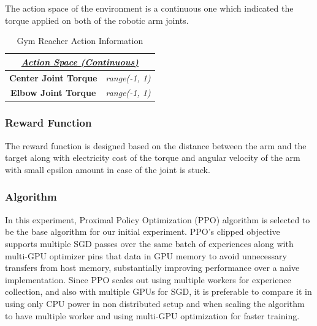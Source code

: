 The action space of the environment is a continuous one which indicated the torque applied on both of the robotic arm joints.


\begin{table}[!htb]
		\centering
		\begin{tabular}{|c|c|}
				\hline
				\multicolumn{2}{|c|}{{\ul \textit{\textbf{Action Space (Continuous)}}}}                             \\ \hline
				\multirow{2}{*}{\textbf{Center Joint Torque}} & \multirow{2}{*}{\textit{range(-1, 1)}} \\
																												&                                        \\ \hline
				\multirow{2}{*}{\textbf{Elbow Joint Torque}}  & \multirow{2}{*}{\textit{range(-1, 1)}} \\
																												&                                        \\ \hline
		\end{tabular}
				\caption{Gym Reacher Action Information}
				\label{tab:gym_reacher_actions}
\end{table}

\subsubsection{Reward Function}

The reward function is designed based on the distance between the arm and the target along with electricity cost of the torque and angular velocity of the arm with small epsilon amount in case of the joint is stuck. 

\subsubsection{Algorithm}

In this experiment, Proximal Policy Optimization (PPO) algorithm is selected to be the base algorithm for our initial experiment. PPO’s clipped objective supports multiple SGD passes over the same batch of experiences along with multi-GPU optimizer pins that data in GPU memory to avoid unnecessary transfers from host memory, substantially improving performance over a naive implementation. Since PPO scales out using multiple workers for experience collection, and also with multiple GPUs for SGD, it is preferable to compare it in using only CPU power in non distributed setup and when scaling the algorithm to have multiple worker and using multi-GPU optimization for faster training.

